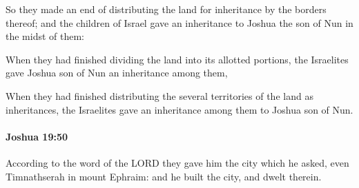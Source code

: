 			\begin{versebox}
					\item[BHS] 
					\item[ASV] So they made an end of distributing the land for inheritance by the borders thereof; and the children of Israel gave an inheritance to Joshua the son of Nun in the midst of them:
					\item[NIV] When they had finished dividing the land into its allotted portions, the Israelites gave Joshua son of Nun an inheritance among them,
					\item[NRSV] When they had finished distributing the several territories of the land as inheritances, the Israelites gave an inheritance among them to Joshua son of Nun.
			\end{versebox}

		\paragraph{Joshua 19:50} %
			\label{JOSHUA-19-50}

			According to the word of the LORD they gave him the city which he asked, even Timnathserah in mount Ephraim: and he built the city, and dwelt therein.

